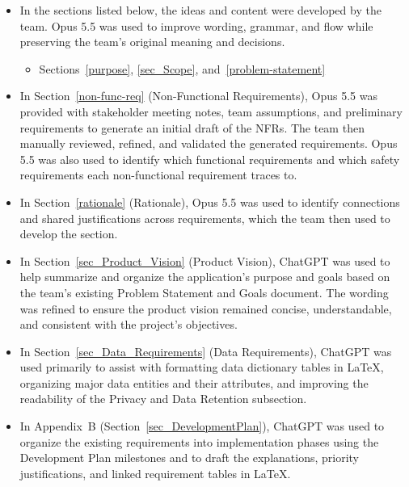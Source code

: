\documentclass[10pt]{article}
\begin{document}
\begin{itemize}
    \item In the sections listed below, the ideas and content
    were developed by the team. Opus 5.5 was used to improve wording,
    grammar, and flow while preserving the team's original meaning and decisions.

    \begin{itemize}
        \item Sections~\ref{purpose}, \ref{sec_Scope}, and~\ref{problem-statement}
    \end{itemize}

    \item In Section~\ref{non-func-req} (Non-Functional Requirements), Opus 5.5 was
    provided with stakeholder meeting notes, team assumptions, and preliminary requirements
    to generate an initial draft of the NFRs. The team then manually reviewed, refined,
    and validated the generated requirements. Opus 5.5 was also used to identify which
    functional requirements and which safety requirements each non-functional requirement traces to.

    \item In Section~\ref{rationale} (Rationale), Opus 5.5 was used to identify connections
    and shared justifications across requirements, which the team then used to develop the section.

    \item In Section~\ref{sec_Product_Vision} (Product Vision),
    ChatGPT was used to help summarize and organize the
    application's purpose and goals based on the team's
    existing Problem Statement and Goals document.
    The wording was refined to ensure the product vision
    remained concise, understandable, and consistent
    with the project's objectives.

    \item In Section~\ref{sec_Data_Requirements} (Data Requirements),
    ChatGPT was used primarily to assist with formatting
    data dictionary tables in \LaTeX{}, organizing major
    data entities and their attributes, and improving
    the readability of the Privacy and Data Retention
    subsection.

    \item In Appendix~B (Section~\ref{sec_DevelopmentPlan}), ChatGPT was used
    to organize the existing requirements into implementation phases using
    the Development Plan milestones and to draft the explanations, priority
    justifications, and linked requirement tables in \LaTeX{}.


\end{itemize}
\end{document}
